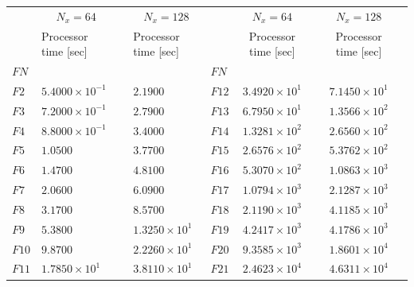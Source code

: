 \documentclass[11pt,titlepage]{report}
\newcommand{\ra}[1]{\renewcommand{\arraystretch}{#1}}
\begin{document}
\begin{table}\centering
\ra{1.4}
\begin{tabular}{@{}llcllclcl@{}}\toprule[2 pt]
&\multicolumn{1}{c}{$N_x = 64$} & \phantom{abc} & \multicolumn{1}{c}{$N_x = 128$} & \phantom{abc} & \multicolumn{1}{c}{$N_x = 64$} & \phantom{abc} & \multicolumn{1}{c}{$N_x = 128$} &\\
\cmidrule{2-2}  \cmidrule{4-4} \cmidrule{6-6} \cmidrule{8-8}
& Processor time [sec] && Processor time [sec] && Processor time [sec] && Processor time [sec] \\
\midrule
\phantom{a}$FN$ & && & \phantom{a}$FN$ \\
\phantom{a}$F2$	&	$5.4000\times 10^{-1}$	&&	$2.1900\phantom{\times 10^{-2}}$	&	\phantom{a}$F12$		 & 	$3.4920\times 10^{1}$	 && 	$7.1450\times 10^{1}$		\\
\phantom{a}$F3$	&	$7.2000\times 10^{-1}$	&&	$2.7900\phantom{\times 10^{-2}}$	&	\phantom{a}$F13$		 & 	$6.7950\times 10^{1}$	 && 	$1.3566\times 10^{2}$		\\
\phantom{a}$F4$	&	$8.8000\times 10^{-1}$	&&	$3.4000\phantom{\times 10^{-3}}$	&	\phantom{a}$F14$		 & 	$1.3281\times 10^{2}$	 && 	$2.6560\times 10^{2}$		\\
\phantom{a}$F5$	&	$1.0500\phantom{\times 10^{-2}}$	&&	$3.7700\phantom{\times 10^{-3}}$	&	\phantom{a}$F15$		 & 	$2.6576\times 10^{2}$	 && 	$5.3762\times 10^{2}$		\\
\phantom{a}$F6$	&	$1.4700\phantom{\times 10^{-2}}$	&&	$4.8100\phantom{\times 10^{-4}}$	&	\phantom{a}$F16$		 & 	$5.3070\times 10^{2}$	 && 	$1.0863\times 10^{3}$		\\
\phantom{a}$F7$	&	$2.0600\phantom{\times 10^{-2}}$	&&	$6.0900\phantom{\times 10^{-4}}$	&	\phantom{a}$F17$		 & 	$1.0794\times 10^{3}$	 && 	$2.1287\times 10^{3}$		\\
\phantom{a}$F8$	&	$3.1700\phantom{\times 10^{-2}}$	&&	$8.5700\phantom{\times 10^{-5}}$	&	\phantom{a}$F18$		 & 	$2.1190\times 10^{3}$	 && 	$4.1185\times 10^{3}$		\\
\phantom{a}$F9$	&	$5.3800\phantom{\times 10^{-2}}$	&&	$1.3250\times 10^{1}$	&	\phantom{a}$F19$		 & 	$4.2417\times 10^{3}$	 && 	$4.1786\times 10^{3}$		\\
\phantom{a}$F10$	&	$9.8700\phantom{\times 10^{-2}}$	&&	$2.2260\times 10^{1}$	&	\phantom{a}$F20$		 & 	$9.3585\times 10^{3}$	 && 	$1.8601\times 10^{4}$		\\
\phantom{a}$F11$	&	$1.7850\times 10^{1}$	&&	$3.8110\times 10^{1}$	&	\phantom{a}$F21$		 & 	$2.4623\times 10^{4}$	 && 	$4.6311\times 10^{4}$		\\

\end{tabular}
\end{table}
\end{document}
